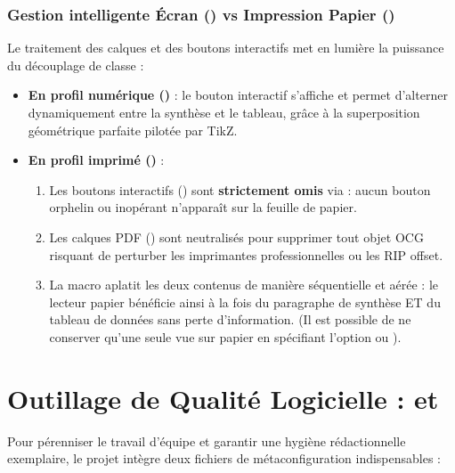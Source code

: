 \subsubsection[Gestion intelligente Écran vs Impression]{Gestion intelligente Écran () vs Impression Papier ()}
Le traitement des calques et des boutons interactifs met en lumière la puissance du découplage de classe :
\begin{itemize}
  \item \textbf{En profil numérique ()} :
  le bouton interactif s'affiche et permet d'alterner dynamiquement entre la synthèse et le tableau, grâce à la superposition géométrique parfaite  pilotée par TikZ.
  \item \textbf{En profil imprimé ()} :
  \begin{enumerate}
    \item Les boutons interactifs () sont \textbf{strictement omis} via  : aucun bouton orphelin ou inopérant n'apparaît sur la feuille de papier.
    \item Les calques PDF () sont neutralisés pour supprimer tout objet OCG risquant de perturber les imprimantes professionnelles ou les RIP offset.
    \item La macro  aplatit les deux contenus de manière séquentielle et aérée : le lecteur papier bénéficie ainsi à la fois du paragraphe de synthèse ET du tableau de données sans perte d'information.
    (Il est possible de ne conserver qu'une seule vue sur papier en spécifiant l'option  ou ).
  \end{enumerate}
\end{itemize}

\section{Outillage de Qualité Logicielle :  et }
\label{sec:qualite-outils}

Pour pérenniser le travail d'équipe et garantir une hygiène rédactionnelle exemplaire,
le projet intègre deux fichiers de métaconfiguration indispensables :

